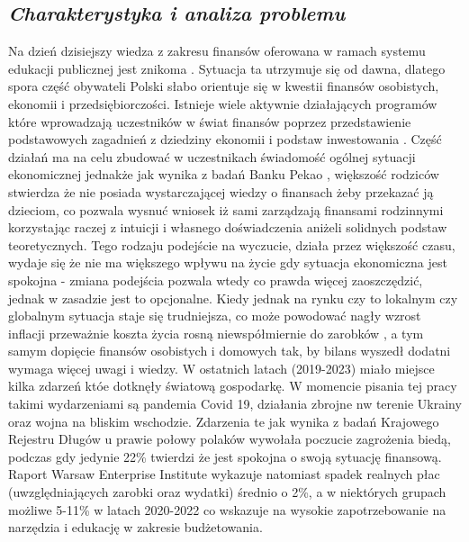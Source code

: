 \documentclass[a4paper,10pt, twoside]{report}
\newcommand{\customstylechapter}[1]{\large{\textit{#1}}}
\begin{document}
\begin{large}
\chapter{\customstylechapter{Charakterystyka i analiza problemu}}

{Na dzień dzisiejszy wiedza z zakresu finansów oferowana w ramach systemu 
edukacji publicznej jest znikoma \cite{edukacjafinansowawszkołach}. Sytuacja ta 
utrzymuje się od dawna, dlatego spora część obywateli Polski słabo orientuje się
 w kwestii finansów osobistych, ekonomii i przedsiębiorczości. Istnieje wiele 
aktywnie działających programów które wprowadzają uczestników w świat finansów 
poprzez przedstawienie podstawowych zagadnień z dziedziny ekonomii i podstaw 
inwestowania \cite{edukacjafinansowawszkołach}. Część działań ma na celu zbudować 
w uczestnikach świadomość ogólnej sytuacji ekonomicznej jednakże jak wynika z 
badań Banku Pekao \cite{edukacjafinansowamlodziezy}, większość rodziców stwierdza
 że nie posiada wystarczającej wiedzy o finansach żeby przekazać ją dzieciom, 
co pozwala wysnuć wniosek iż sami zarządzają finansami rodzinnymi korzystając 
raczej z intuicji i własnego doświadczenia aniżeli solidnych podstaw 
teoretycznych. Tego rodzaju podejście na wyczucie, działa przez większość czasu, 
wydaje się że nie ma większego wpływu na życie gdy sytuacja ekonomiczna jest 
spokojna - zmiana podejścia pozwala wtedy co prawda więcej zaoszczędzić, jednak 
w zasadzie jest to opcjonalne. Kiedy jednak na rynku czy to lokalnym czy 
globalnym sytuacja staje się trudniejsza, co może powodować nagły wzrost 
inflacji przeważnie koszta życia rosną niewspółmiernie do 
zarobków \cite{gussytuacjabudzetowa}\cite{koszty2010-22}, a tym samym dopięcie 
finansów osobistych i domowych tak, by bilans wyszedł dodatni wymaga więcej 
uwagi i wiedzy. W ostatnich latach (2019-2023) miało miejsce kilka zdarzeń któe 
dotknęły światową gospodarkę. W momencie pisania tej pracy takimi wydarzeniami 
są pandemia Covid 19, działania zbrojne nw terenie Ukrainy oraz wojna na bliskim
 wschodzie. Zdarzenia te jak wynika z badań Krajowego Rejestru Długów 
\cite{portfelpolakawpandemii} u prawie połowy polaków wywołała poczucie 
zagrożenia biedą, podczas gdy jedynie 22\% twierdzi że jest spokojna o swoją 
sytuację finansową. Raport Warsaw Enterprise Institute \cite{weiinflacja} 
wykazuje natomiast spadek realnych płac (uwzględniających zarobki oraz wydatki) 
średnio o 2\%, a w niektórych grupach możliwe 5-11\% w latach 2020-2022 co 
wskazuje na wysokie zapotrzebowanie na narzędzia i edukację w zakresie 
budżetowania.}


\end{large}
\end{document}
